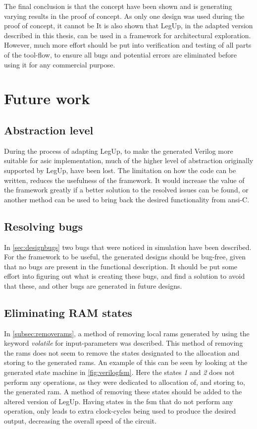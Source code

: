 The final conclusion is that the concept have been shown and is generating varying results in the proof of concept. As only one design was used during the proof of concept, it cannot be  It is also shown that LegUp, in the adapted version described in this thesis, can be used in a framework for architectural exploration. However, much more effort should be put into verification and testing of all parts of the tool-flow, to ensure all bugs and potential errors are eliminated before using it for any commercial purpose.
\section{Future work}
\label{sec:futurework} 
\subsection{Abstraction level}
During the process of adapting LegUp, to make the generated Verilog more suitable for \gls{asic} implementation, much of the higher level of abstraction originally supported by LegUp, have been lost. The limitation on how the code can be written, reduces the usefulness of the framework. It would increase the value of the framework greatly if a better solution to the resolved issues can be found, or another method can be used to bring back the desired functionality from \gls{ansi}-C.

\subsection{Resolving bugs}
In \cref{sec:designbugs} two bugs that were noticed in simulation have been described. For the framework to be useful, the generated designs should be bug-free, given that no bugs are present in the functional description. It should be put some effort into figuring out what is creating these bugs, and find a solution to avoid that these, and other bugs are generated in future designs.

\subsection{Eliminating RAM states}
In \cref{subsec:removerams}, a method of removing local \gls{ram}s generated by using the keyword \textit{volatile} for input-parameters was described. This method of removing the \gls{ram}s does not seem to remove the states designated to the allocation and storing to the generated \gls{ram}s. An example of this can be seen by looking at the generated state machine in \cref{fig:verilogfsm}. Here the states \textit{1} and \textit{2} does not perform any operations, as they were dedicated to allocation of, and storing to, the generated \gls{ram}. A method of removing these states should be added to the altered version of LegUp. Having states in the \gls{fsm} that do not perform any operation, only leads to extra clock-cycles being used to produce the desired output, decreasing the overall speed of the circuit.

